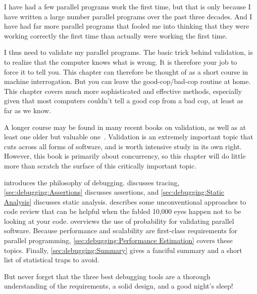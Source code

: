 
%

I have had a few parallel programs work the first time, but that is only
because I have written a large number parallel programs over the past three
decades.
And I have had far more parallel programs that fooled me into thinking
that they were working correctly the first time than actually were working
the first time.

I thus need to validate my parallel programs.
The basic trick behind validation, is to realize that the computer knows
what is wrong.
It is therefore your job to force it to tell you.
This chapter can therefore be thought of as a short course in
machine interrogation.
But you can leave the good-cop/bad-cop routine at home.
This chapter covers much more sophisticated and effective methods,
especially given that most computers couldn't tell a good cop from a
bad cop, at least as far as we know.

A longer course may be found in many recent books on validation, as
well as at least one older but valuable
one~\cite{GlenfordJMyers1979}.
Validation is an extremely important topic that cuts across all forms
of software, and is worth intensive study in its own right.
However, this book is primarily about concurrency, so this chapter will do
little more than scratch the surface of this critically important topic.

introduces the philosophy of debugging.
discusses tracing,
\cref{sec:debugging:Assertions}
discusses assertions, and
\cref{sec:debugging:Static Analysis}
discusses static analysis.
describes some unconventional approaches to code review that can
be helpful when the fabled 10,000 eyes happen not to be looking at your code.
overviews the use of probability for validating parallel software.
Because performance and scalability are first-class requirements
for parallel programming,
\cref{sec:debugging:Performance Estimation} covers these
topics.
Finally,
\cref{sec:debugging:Summary}
gives a fanciful summary and a short list of statistical traps to avoid.

But never forget that the three best debugging tools are a thorough
understanding of the requirements, a solid design, and a good night's
sleep!


